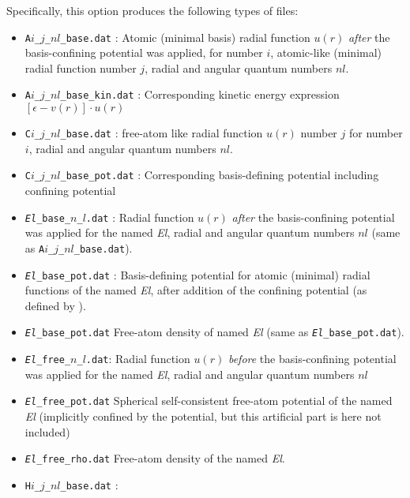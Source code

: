 Specifically, this option produces the following types of files:
\begin{itemize}
  \item \texttt{A$i$\_$j$\_$nl$\_base.dat} : Atomic (minimal basis)
    radial function $u(r)$ \emph{after} the basis-confining potential
    was applied, for  number $i$, atomic-like
    (minimal) radial function  number $j$, radial and angular quantum
    numbers $nl$.
  \item \texttt{A$i$\_$j$\_$nl$\_base\_kin.dat} : Corresponding
    kinetic energy expression $[\epsilon - v(r)]\cdot u(r)$
  \item \texttt{C$i$\_$j$\_$nl$\_base.dat} :
     free-atom like radial function $u(r)$
      number $j$ for  number $i$, radial and angular
      quantum numbers $nl$.
  \item \texttt{C$i$\_$j$\_$nl$\_base\_pot.dat} : Corresponding
    basis-defining potential including confining potential
  \item \texttt{\emph{El}\_base\_$n$\_$l$.dat} : Radial function
    $u(r)$ \emph{after} the basis-confining potential was applied for
    the  named \emph{El}, radial and angular
      quantum numbers $nl$ (same as
    \texttt{A$i$\_$j$\_$nl$\_base.dat}).
  \item \texttt{\emph{El}\_base\_pot.dat} : Basis-defining potential
    for atomic (minimal) radial functions of the 
    named \emph{El}, after addition of the confining potential (as
    defined by ).
  \item \texttt{\emph{El}\_base\_pot.dat} Free-atom density of
     named \emph{El} (same as
    \texttt{\emph{El}\_base\_pot.dat}).
  \item  \texttt{\emph{El}\_free\_$n$\_$l$.dat}: Radial function
    $u(r)$ \emph{before} the basis-confining potential was applied for
    the  named \emph{El}, radial and angular
    quantum numbers $nl$
  \item \texttt{\emph{El}\_free\_pot.dat} Spherical self-consistent
    free-atom potential of the  named \emph{El}
    (implicitly confined by the 
    potential, but this artificial part is here not included)
  \item \texttt{\emph{El}\_free\_rho.dat} Free-atom density of
    the  named \emph{El}.
  \item \texttt{H$i$\_$j$\_$nl$\_base.dat} :

\end{itemize}
